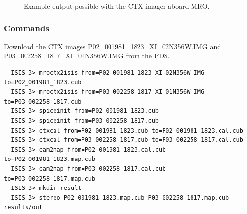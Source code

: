 \begin{figure}[b!]
\centering
  \hfil
\caption{Example output possible with the CTX imager aboard MRO.}
\label{fig:ctx_example}
\end{figure}

\subsubsection*{Commands}

Download the \ac{CTX} images P02\_001981\_1823\_XI\_02N356W.IMG and
P03\_002258\_1817\_XI\_01N356W.IMG from the \ac{PDS}.
\begin{verbatim}
  ISIS 3> mroctx2isis from=P02_001981_1823_XI_02N356W.IMG to=P02_001981_1823.cub
  ISIS 3> mroctx2isis from=P03_002258_1817_XI_01N356W.IMG to=P03_002258_1817.cub
  ISIS 3> spiceinit from=P02_001981_1823.cub
  ISIS 3> spiceinit from=P03_002258_1817.cub
  ISIS 3> ctxcal from=P02_001981_1823.cub to=P02_001981_1823.cal.cub
  ISIS 3> ctxcal from=P03_002258_1817.cub to=P03_002258_1817.cal.cub
  ISIS 3> cam2map from=P02_001981_1823.cal.cub to=P02_001981_1823.map.cub
  ISIS 3> cam2map from=P03_002258_1817.cal.cub to=P03_002258_1817.map.cub
  ISIS 3> mkdir result
  ISIS 3> stereo P02_001981_1823.map.cub P03_002258_1817.map.cub results/out
\end{verbatim}

